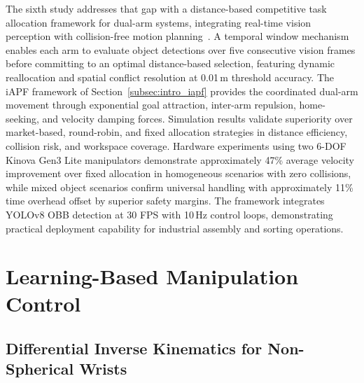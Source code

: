 The sixth study addresses that gap with a distance-based competitive task allocation framework for
dual-arm systems, integrating real-time vision perception with collision-free motion
planning~\citep{sk2025competitive}. A temporal window mechanism
enables each arm to evaluate object detections over five consecutive vision frames before committing
to an optimal distance-based selection, featuring dynamic reallocation and spatial conflict
resolution at 0.01\,m threshold accuracy. The iAPF framework of Section~\ref{subsec:intro_iapf}
provides the coordinated dual-arm movement through exponential goal attraction, inter-arm repulsion,
home-seeking, and velocity damping forces. Simulation results validate superiority over
market-based, round-robin, and fixed allocation strategies in distance efficiency, collision risk,
and workspace coverage. Hardware experiments using two 6-DOF Kinova Gen3 Lite manipulators
demonstrate approximately 47\% average velocity improvement over fixed allocation in homogeneous
scenarios with zero collisions, while mixed object scenarios confirm universal handling with
approximately 11\% time overhead offset by superior safety margins. The framework integrates YOLOv8
OBB detection at 30 FPS with 10\,Hz control loops, demonstrating practical deployment capability for
industrial assembly and sorting operations.

\section{Learning-Based Manipulation Control}\label{sec:intro_learning}

\subsection{Differential Inverse Kinematics for Non-Spherical Wrists}\label{subsec:intro_dik}

